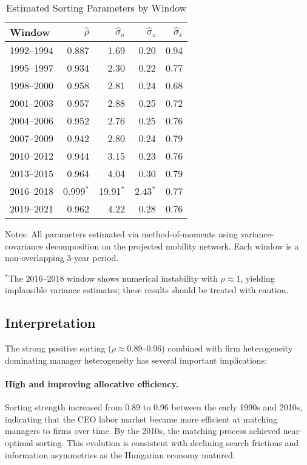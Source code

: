 \documentclass[11pt]{article}
\begin{document}
\begin{table}[t]
\centering
\caption{Estimated Sorting Parameters by Window}
\label{tab:estimates}
\begin{threeparttable}
\begin{tabular}{lrrrr}
\toprule
Window & $\widehat\rho$ & $\widehat\sigma_a$ & $\widehat\sigma_z$ & $\widehat\sigma_\varepsilon$ \\
\midrule
1992--1994 & 0.887 & 1.69 & 0.20 & 0.94 \\
1995--1997 & 0.934 & 2.30 & 0.22 & 0.77 \\
1998--2000 & 0.958 & 2.81 & 0.24 & 0.68 \\
2001--2003 & 0.957 & 2.88 & 0.25 & 0.72 \\
2004--2006 & 0.952 & 2.76 & 0.25 & 0.76 \\
2007--2009 & 0.942 & 2.80 & 0.24 & 0.79 \\
2010--2012 & 0.944 & 3.15 & 0.23 & 0.76 \\
2013--2015 & 0.964 & 4.04 & 0.30 & 0.79 \\
2016--2018 & 0.999$^*$ & 19.91$^*$ & 2.43$^*$ & 0.77 \\
2019--2021 & 0.962 & 4.22 & 0.28 & 0.76 \\
\bottomrule
\end{tabular}
\begin{tablenotes}
\footnotesize
\item Notes: All parameters estimated via method-of-moments using variance-covariance decomposition on the projected mobility network. Each window is a non-overlapping 3-year period.
\item $^*$The 2016--2018 window shows numerical instability with $\rho \approx 1$, yielding implausible variance estimates; these results should be treated with caution.
\end{tablenotes}
\end{threeparttable}
\end{table}

\subsection{Interpretation}
The strong positive sorting ($\rho \approx 0.89$--0.96) combined with firm heterogeneity dominating manager heterogeneity has several important implications:

\paragraph{High and improving allocative efficiency.} Sorting strength increased from 0.89 to 0.96 between the early 1990s and 2010s, indicating that the CEO labor market became more efficient at matching managers to firms over time. By the 2010s, the matching process achieved near-optimal sorting. This evolution is consistent with declining search frictions and information asymmetries as the Hungarian economy matured.
\end{document}
